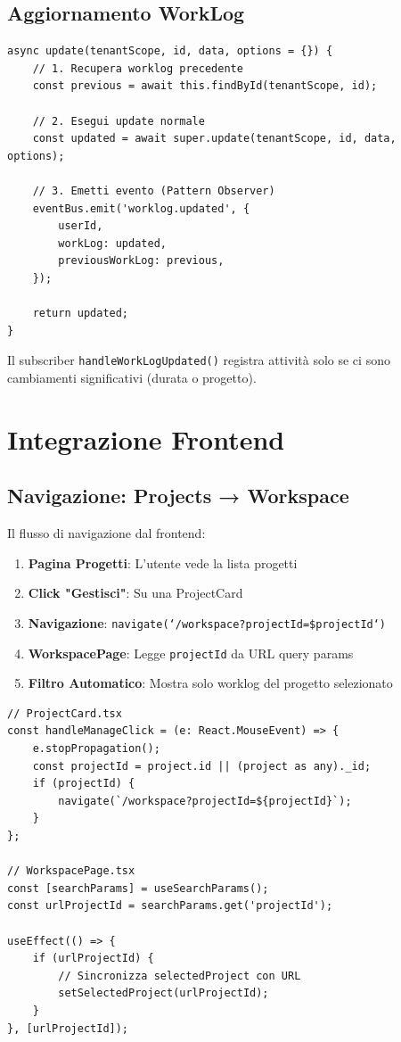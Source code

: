 \documentclass[11pt,a4paper]{article}
\begin{document}
\subsection{Aggiornamento WorkLog}

\begin{lstlisting}[caption=Flusso Update WorkLog]
async update(tenantScope, id, data, options = {}) {
    // 1. Recupera worklog precedente
    const previous = await this.findById(tenantScope, id);
    
    // 2. Esegui update normale
    const updated = await super.update(tenantScope, id, data, options);
    
    // 3. Emetti evento (Pattern Observer)
    eventBus.emit('worklog.updated', {
        userId,
        workLog: updated,
        previousWorkLog: previous,
    });
    
    return updated;
}
\end{lstlisting}

Il subscriber \texttt{handleWorkLogUpdated()} registra attività solo se ci sono cambiamenti significativi (durata o progetto).

\section{Integrazione Frontend}

\subsection{Navigazione: Projects → Workspace}

Il flusso di navigazione dal frontend:

\begin{enumerate}
    \item \textbf{Pagina Progetti}: L'utente vede la lista progetti
    \item \textbf{Click "Gestisci"}: Su una ProjectCard
    \item \textbf{Navigazione}: \texttt{navigate(`/workspace?projectId=\${projectId}`)}
    \item \textbf{WorkspacePage}: Legge \texttt{projectId} da URL query params
    \item \textbf{Filtro Automatico}: Mostra solo worklog del progetto selezionato
\end{enumerate}

\begin{lstlisting}[caption=Navigazione Frontend]
// ProjectCard.tsx
const handleManageClick = (e: React.MouseEvent) => {
    e.stopPropagation();
    const projectId = project.id || (project as any)._id;
    if (projectId) {
        navigate(`/workspace?projectId=${projectId}`);
    }
};

// WorkspacePage.tsx
const [searchParams] = useSearchParams();
const urlProjectId = searchParams.get('projectId');

useEffect(() => {
    if (urlProjectId) {
        // Sincronizza selectedProject con URL
        setSelectedProject(urlProjectId);
    }
}, [urlProjectId]);
\end{lstlisting}
\end{document}
